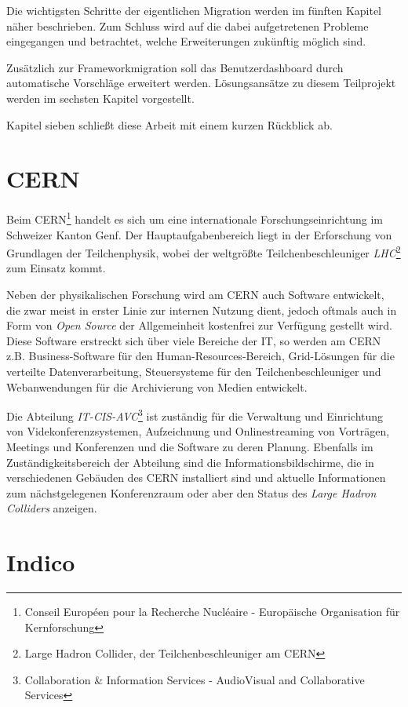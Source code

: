 Die wichtigsten Schritte der eigentlichen Migration werden im fünften Kapitel näher beschrieben. Zum
Schluss wird auf die dabei aufgetretenen Probleme eingegangen und betrachtet, welche Erweiterungen
zukünftig möglich sind.

Zusätzlich zur Frameworkmigration soll das Benutzerdashboard durch automatische Vorschläge erweitert
werden. Lösungsansätze zu diesem Teilprojekt werden im sechsten Kapitel vorgestellt.

Kapitel sieben schließt diese Arbeit mit einem kurzen Rückblick ab.


\section{CERN}

Beim CERN\footnote{Conseil Européen pour la Recherche Nucléaire - Europäische Organisation für
Kernforschung} handelt es sich um eine internationale Forschungseinrichtung im Schweizer Kanton
Genf. Der Hauptaufgabenbereich liegt in der Erforschung von Grundlagen der Teilchenphysik, wobei der
weltgrößte Teilchenbeschleuniger \emph{LHC}\footnote{Large Hadron Collider, der
Teilchenbeschleuniger am CERN} zum Einsatz kommt.

Neben der physikalischen Forschung wird am CERN auch Software entwickelt, die zwar meist in erster
Linie zur internen Nutzung dient, jedoch oftmals auch in Form von \emph{Open Source} der
Allgemeinheit kostenfrei zur Verfügung gestellt wird. Diese Software erstreckt sich über viele
Bereiche der IT, so werden am CERN z.B. Business-Software für den Human-Resources-Bereich,
Grid-Lösungen für die verteilte Datenverarbeitung, Steuersysteme für den Teilchenbeschleuniger und
Webanwendungen für die Archivierung von Medien entwickelt.

Die Abteilung \emph{IT-CIS-AVC}\footnote{Collaboration \& Information Services - AudioVisual and
Collaborative Services} ist zuständig für die Verwaltung und Einrichtung von Videkonferenzsystemen,
Aufzeichnung und Onlinestreaming von Vorträgen, Meetings und Konferenzen und die Software zu deren
Planung. Ebenfalls im Zuständigkeitsbereich der Abteilung sind die Informationsbildschirme, die in
verschiedenen Gebäuden des CERN installiert sind und aktuelle Informationen zum nächstgelegenen
Konferenzraum oder aber den Status des \emph{Large Hadron Colliders} anzeigen.


\section{Indico}

